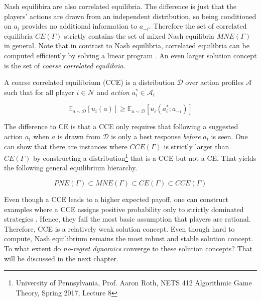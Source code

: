 Nash equilibira are also correlated equilibria. The difference is just that the players' actions are drawn from an independent distribution, so being conditioned on $a_i$ provides no additional information to $a_{-i}$. Therefore the set of correlated equilibria $CE(\Gamma)$ strictly contains the set of mixed Nash equilibria $MNE(\Gamma)$ in general. Note that in contrast to Nash equilibria, correlated equilibria can be computed efficiently by solving a linear program \cite{HDRmertikopoulos}. An even larger solution concept is the set of \textit{coarse correlated equilibria}. 

\begin{definition}
    A coarse correlated equilibrium (CCE) is a distribution $\mathcal{D}$ over action profiles $\mathcal{A}$ such that for all player $i \in \mathcal{N}$ and \textit{action} $a_{i}^{*} \in \mathcal{A}_i$

    \[\mathbb{E}_{a \sim \mathcal{D}}[u_i(a)] \ge \mathbb{E}_{a \sim \mathcal{D}}[u_i(a_{i}^{*};a_{-i})]\]
\end{definition}

The difference to CE is that a CCE only requires that following a suggested action $a_i$ when $a$ is drawn from $\mathcal{D}$ is only a best response \textit{before} $a_i$ is seen. One can show that there are instances where $CCE(\Gamma)$ is strictly larger than $CE(\Gamma)$ by constructing a distribution\footnote{University of Pennsylvania, Prof. Aaron Roth, NETS 412 Algorithmic Game Theory, Spring 2017, Lecture 8} that is a CCE but not a CE. That yields the following general equilibrium hierarchy.

\begin{equation*}
    PNE(\Gamma) \subset MNE(\Gamma) \subset CE(\Gamma) \subset CCE(\Gamma)
\end{equation*}

Even though a CCE leads to a higher expected payoff, one can construct examples where a CCE assigns positive probability only to strictly dominated strategies \cite{viossat}. Hence, they fail the most basic assumption that players are rational. Therefore, CCE is a relatively weak solution concept. Even though hard to compute, Nash equilibrium remains the most robust and stable solution concept. To what extent do \textit{no-regret dynamics} converge to these solution concepts? That will be discussed in the next chapter.


